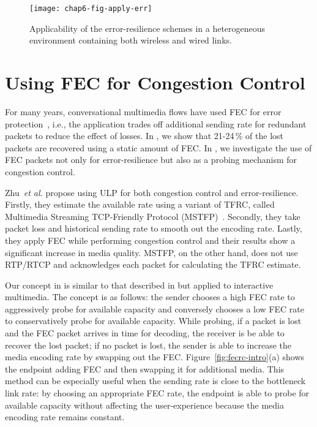 \begin{figure}
\centerline {
\texttt{[image: chap6-fig-apply-err]}
}
\caption{Applicability of the error-resilience schemes in a heterogeneous
environment containing both wireless and wired links.}
\label{fig:apply_err}
\end{figure}


\section{Using FEC for Congestion Control}

For many years, conversational multimedia flows have used FEC for error 
protection~\cite{wang00review, wang98error}, i.e., the
application trades off additional sending rate for redundant packets to reduce
the effect of losses. In , we show that 21-24\,\% of the lost
packets are recovered using a static amount of FEC. In , we
investigate the use of FEC packets not only for error-resilience but also as a
probing mechanism for congestion control.

Zhu~\textit{et al.}\cite{Zhu:2001tu,springerlink:1022865704606} propose using
ULP for both congestion control and error-resilience. 
Firstly, they estimate the available rate using a variant of TFRC,
called Multimedia Streaming TCP-Friendly Protocol (MSTFP)~\cite{871542}.
Secondly, they take packet loss and historical sending rate to smooth out the
encoding rate. Lastly, they apply FEC while performing congestion control and
their results show a significant increase in media quality. MSTFP, on the other
hand, does not use RTP/RTCP and acknowledges each packet for calculating the
TFRC estimate.

Our concept in  is similar to that described in
\cite{Zhu:2001tu} but applied to interactive multimedia. The concept is as
follows: the sender chooses a high FEC rate to aggressively probe for
available capacity and conversely chooses a low FEC rate to conservatively
probe for available capacity. While probing, if a packet is lost and the FEC
packet arrives in time for decoding, the receiver is be able to recover the
lost packet; if no packet is lost, the sender is able to increase the media
encoding rate by swapping out the FEC. Figure~\ref{fig:fecrc-intro}(a) shows
the endpoint adding FEC and then swapping it for additional media. This method
can be especially useful when the sending rate is close to the bottleneck link
rate: by choosing an appropriate FEC rate, the endpoint is able to probe for
available capacity without affecting the user-experience because the media
encoding rate remains constant.

